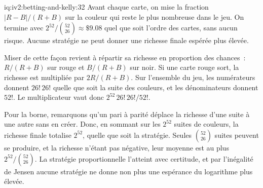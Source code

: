 \begin{solution}{iq:iv2:betting-and-kelly:32}
Avant chaque carte, on mise la fraction $|R - B|/(R + B)$ sur la couleur qui reste le plus nombreuse dans le jeu. On termine avec $2^{52}/\binom{52}{26} \approx \$9.08$ quel que soit l'ordre des cartes, sans aucun risque. Aucune stratégie ne peut donner une richesse finale espérée plus élevée.

Miser de cette façon revient à répartir sa richesse en proportion des chances~: $R/(R + B)$ sur rouge et $B/(R + B)$ sur noir. Si une carte rouge sort, la richesse est multipliée par $2R/(R + B)$. Sur l'ensemble du jeu, les numérateurs donnent $26!\,26!$ quelle que soit la suite des couleurs, et les dénominateurs donnent $52!$. Le multiplicateur vaut donc $2^{52}\,26!\,26!/52!$.

Pour la borne, remarquons qu'un pari à parité déplace la richesse d'une suite à une autre sans en créer. Donc, en sommant sur les $2^{52}$ suites de couleurs, la richesse finale totalise $2^{52}$, quelle que soit la stratégie. Seules $\binom{52}{26}$ suites peuvent se produire, et la richesse n'étant pas négative, leur moyenne est au plus $2^{52}/\binom{52}{26}$. La stratégie proportionnelle l'atteint avec certitude, et par l'inégalité de Jensen aucune stratégie ne donne non plus une espérance du logarithme plus élevée.

\end{solution}

